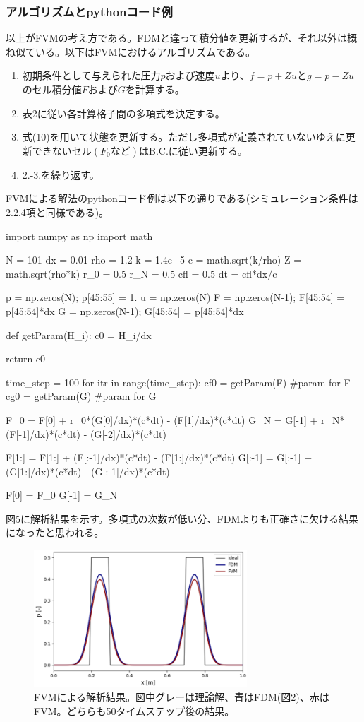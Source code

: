 \documentclass[dvipdfmx, 9pt, a4paper]{jsarticle}
\begin{document}
\subsubsection{アルゴリズムとpythonコード例}
以上がFVMの考え方である。FDMと違って積分値を更新するが、それ以外は概ね似ている。以下はFVMにおけるアルゴリズムである。
\begin{tcolorbox}[title=FVMによる移流方程式の求解]
\begin{enumerate}
\item 初期条件として与えられた圧力$p$および速度$u$より、$f=p+Zu$と$g=p-Zu$のセル積分値$F$および$G$を計算する。
\item 表2に従い各計算格子間の多項式を決定する。
\item 式(10)を用いて状態を更新する。ただし多項式が定義されていないゆえに更新できないセル$(F_0など)$はB.C.に従い更新する。
\item 2.-3.を繰り返す。
\end{enumerate}
\end{tcolorbox}
FVMによる解法のpythonコード例は以下の通りである(シミュレーション条件は2.2.4項と同様である)。
\begin{python}
import numpy as np
import math

N = 101
dx = 0.01
rho = 1.2
k = 1.4e+5
c = math.sqrt(k/rho)
Z = math.sqrt(rho*k)
r_0 = 0.5
r_N = 0.5
cfl = 0.5
dt = cfl*dx/c

p = np.zeros(N); p[45:55] = 1.
u = np.zeros(N)
F = np.zeros(N-1); F[45:54] = p[45:54]*dx
G = np.zeros(N-1); G[45:54] = p[45:54]*dx


def getParam(H_i):
	c0 = H_i/dx

	return c0

time_step = 100
for itr in range(time_step):
	cf0 = getParam(F) #param for F
	cg0 = getParam(G) #param for G

	F_0 = F[0] + r_0*(G[0]/dx)*(c*dt) - (F[1]/dx)*(c*dt)
	G_N = G[-1] + r_N*(F[-1]/dx)*(c*dt) - (G[-2]/dx)*(c*dt)

	F[1:] = F[1:] + (F[:-1]/dx)*(c*dt) - (F[1:]/dx)*(c*dt)
	G[:-1] = G[:-1] + (G[1:]/dx)*(c*dt) - (G[:-1]/dx)*(c*dt)

	F[0] = F_0
	G[-1] = G_N
\end{python}\par
図5に解析結果を示す。多項式の次数が低い分、FDMよりも正確さに欠ける結果になったと思われる。

\begin{figure}[b]
\begin{center}
\includegraphics[width=8cm]{"fig5.png"}
\caption{FVMによる解析結果。図中グレーは理論解、青はFDM(図2)、赤はFVM。どちらも50タイムステップ後の結果。}
\end{center}
\end{figure}
\end{document}
